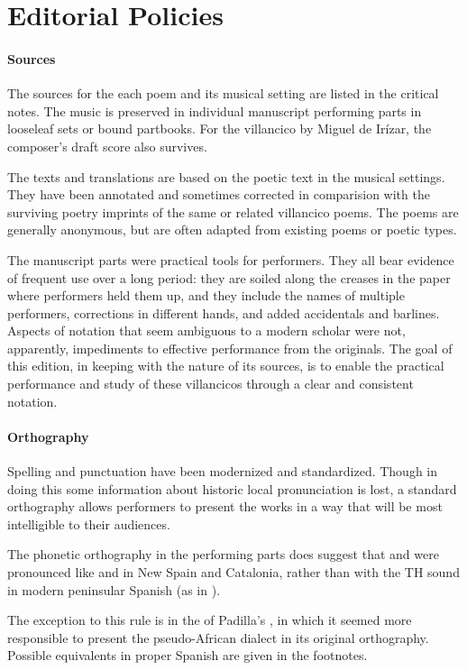 \section*{Editorial Policies}

\paragraph{Sources}

The sources for the each poem and its musical setting are listed in the 
critical notes.
The music is preserved in individual manuscript performing parts in looseleaf 
sets or bound partbooks.
For the villancico by Miguel de Irízar, the composer's draft score also 
survives.

The texts and translations are based on the poetic text in the musical settings.
They have been annotated and sometimes corrected in comparision with the 
surviving poetry imprints of the same or related villancico poems.
The poems are generally anonymous, but are often adapted from existing poems or 
poetic types.

The manuscript parts were practical tools for performers.
They all bear evidence of frequent use over a long period: they are soiled 
along the creases in the paper where performers held them up, and they include 
the names of multiple performers, corrections in different hands, and added 
accidentals and barlines.
Aspects of notation that seem ambiguous to a modern scholar were not, 
apparently, impediments to effective performance from the originals.
The goal of this edition, in keeping with the nature of its sources, is to 
enable the practical performance and study of these villancicos through a clear
and consistent notation.


\paragraph{Orthography}
Spelling and punctuation have been modernized and standardized.
Though in doing this some information about historic local pronunciation is
lost, a standard orthography allows performers to present the works in a way
that will be most intelligible to their audiences.%
\begin{Footnote}
    The phonetic orthography in the performing parts does suggest that
     and  were pronounced like  and
     in New Spain and Catalonia, rather than with the TH sound in
    modern peninsular Spanish (as in ).
\end{Footnote}
The exception to this rule is in the  of Padilla's , in which it seemed more responsible to present the 
pseudo-African dialect in its original orthography.
Possible equivalents in proper Spanish are given in the footnotes.

